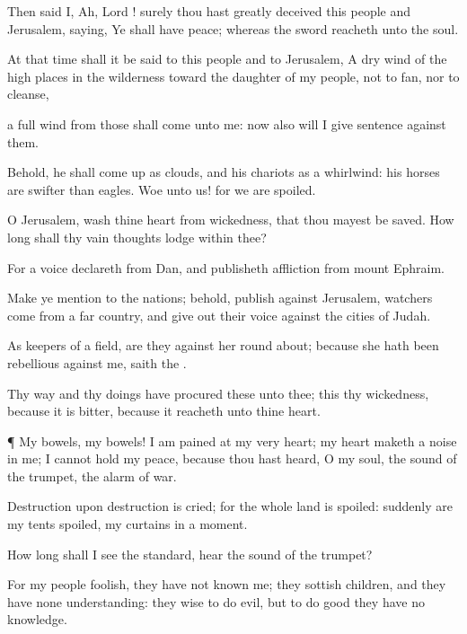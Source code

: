 {Then
said I,
Ah,
Lord
{}!
surely thou hast
greatly
deceived this
people and
Jerusalem,
saying, Ye shall have
peace; whereas the
sword
reacheth unto the
soul.

At that
time shall it be
said to this
people and to
Jerusalem, A
dry
wind of the high
places in the
wilderness
toward the
daughter of my
people, not to
fan, nor to
cleanse,

 a
full
wind from those
{} shall
come unto me: now also will I
give
sentence against them.

Behold, he shall come
up as
clouds, and his
chariots
{} as a
whirlwind: his
horses are
swifter than
eagles.
Woe unto us! for we are
spoiled.

O
Jerusalem,
wash thine
heart from
wickedness, that thou mayest be
saved. How long shall thy
vain
thoughts
lodge
within thee?

For a
voice
declareth from
Dan, and
publisheth
affliction from
mount
Ephraim.

Make ye
mention to the
nations; behold,
publish against
Jerusalem,
{}
watchers
come from a
far
country, and give
out their
voice against the
cities of
Judah.

As
keepers of a
field, are they against her round
about; because she hath been
rebellious against me,
saith the
{}.

Thy
way and thy
doings have
procured these
{} unto thee; this
{} thy
wickedness, because it is
bitter, because it
reacheth unto thine
heart.


\par }{\PP {}¶ My
bowels, my
bowels! I am
pained at my
very
heart; my
heart maketh a
noise in me; I cannot hold my
peace, because thou hast
heard, O my
soul, the
sound of the
trumpet, the
alarm of
war.

Destruction upon
destruction is
cried; for the whole
land is
spoiled:
suddenly are my
tents
spoiled,
{} my
curtains in a
moment.

How long shall I
see the
standard,
{}
hear the
sound of the
trumpet?

For my
people
{}
foolish, they have not
known me; they
{}
sottish
children, and they have none
understanding: they
{}
wise to do
evil, but to do
good they have no
knowledge.

}
